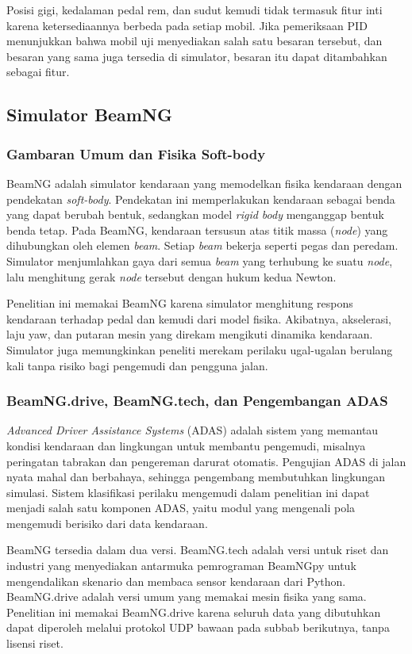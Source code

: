 Posisi gigi, kedalaman pedal rem, dan sudut kemudi tidak termasuk fitur inti karena ketersediaannya berbeda pada setiap mobil. Jika pemeriksaan PID menunjukkan bahwa mobil uji menyediakan salah satu besaran tersebut, dan besaran yang sama juga tersedia di simulator, besaran itu dapat ditambahkan sebagai fitur.

\subsection{Simulator BeamNG}
\subsubsection{Gambaran Umum dan Fisika Soft-body}
BeamNG adalah simulator kendaraan yang memodelkan fisika kendaraan dengan pendekatan \textit{soft-body}. Pendekatan ini memperlakukan kendaraan sebagai benda yang dapat berubah bentuk, sedangkan model \textit{rigid body} menganggap bentuk benda tetap. Pada BeamNG, kendaraan tersusun atas titik massa (\textit{node}) yang dihubungkan oleh elemen \textit{beam}. Setiap \textit{beam} bekerja seperti pegas dan peredam. Simulator menjumlahkan gaya dari semua \textit{beam} yang terhubung ke suatu \textit{node}, lalu menghitung gerak \textit{node} tersebut dengan hukum kedua Newton.

Penelitian ini memakai BeamNG karena simulator menghitung respons kendaraan terhadap pedal dan kemudi dari model fisika. Akibatnya, akselerasi, laju yaw, dan putaran mesin yang direkam mengikuti dinamika kendaraan. Simulator juga memungkinkan peneliti merekam perilaku ugal-ugalan berulang kali tanpa risiko bagi pengemudi dan pengguna jalan.

\subsubsection{BeamNG.drive, BeamNG.tech, dan Pengembangan ADAS}
\textit{Advanced Driver Assistance Systems} (ADAS) adalah sistem yang memantau kondisi kendaraan dan lingkungan untuk membantu pengemudi, misalnya peringatan tabrakan dan pengereman darurat otomatis. Pengujian ADAS di jalan nyata mahal dan berbahaya, sehingga pengembang membutuhkan lingkungan simulasi. Sistem klasifikasi perilaku mengemudi dalam penelitian ini dapat menjadi salah satu komponen ADAS, yaitu modul yang mengenali pola mengemudi berisiko dari data kendaraan.

BeamNG tersedia dalam dua versi. BeamNG.tech adalah versi untuk riset dan industri yang menyediakan antarmuka pemrograman BeamNGpy untuk mengendalikan skenario dan membaca sensor kendaraan dari Python. BeamNG.drive adalah versi umum yang memakai mesin fisika yang sama. Penelitian ini memakai BeamNG.drive karena seluruh data yang dibutuhkan dapat diperoleh melalui protokol UDP bawaan pada subbab berikutnya, tanpa lisensi riset.

